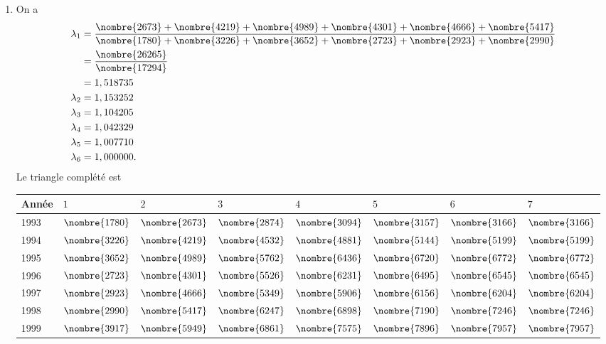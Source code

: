 \begin{exercice}
\begin{sol}
    \begin{enumerate}
    \item On a
      \begin{align*}
        \lambda_1 &= \frac{\nombre{2673} + \nombre{4219} + \nombre{4989}
                    +\nombre{4301} + \nombre{4666} + \nombre{5417}}{\nombre{1780} +
                    \nombre{3226} + \nombre{3652} + \nombre{2723} + \nombre{2923} + \nombre{2990}}\\
                  &=  \frac{\nombre{26265}}{\nombre{17294}}\\
                  &= 1,518735\\
        \lambda_2 &=  1,153252\\
        \lambda_3 &= 1,104205\\
        \lambda_4 &=  1,042329\\
        \lambda_5 &= 1,007710\\
        \lambda_6 &= 1,000000.
      \end{align*}
      Le triangle complété est
      \begin{center}
        \begin{tabular}{|l|l l l l l l l|}\hline
          Année & $1$ & $2$ & $3$ & $4$ & $5$ & $6$ & $7$\\ \hline
          1993& $\nombre{1780}$& $\nombre{2673}$& $\nombre{2874}$& $\nombre{3094}$& $\nombre{3157}$& $\nombre{3166}$& $\nombre{3166}$ \\
          1994& $\nombre{3226}$& $\nombre{4219}$& $\nombre{4532}$& $\nombre{4881}$& $\nombre{5144}$& $\nombre{5199}$& $\nombre{5199}$ \\
          1995& $\nombre{3652}$& $\nombre{4989}$& $\nombre{5762}$& $\nombre{6436}$& $\nombre{6720}$& $\nombre{6772}$& $\nombre{6772}$ \\
          1996& $\nombre{2723}$& $\nombre{4301}$& $\nombre{5526}$& $\nombre{6231}$& $\nombre{6495}$& $\nombre{6545}$& $\nombre{6545}$ \\
          1997& $\nombre{2923}$& $\nombre{4666}$& $\nombre{5349}$& $\nombre{5906}$& $\nombre{6156}$& $\nombre{6204}$& $\nombre{6204}$ \\
          1998& $\nombre{2990}$& $\nombre{5417}$& $\nombre{6247}$& $\nombre{6898}$& $\nombre{7190}$& $\nombre{7246}$& $\nombre{7246}$ \\
          1999& $\nombre{3917}$& $\nombre{5949}$& $\nombre{6861}$& $\nombre{7575}$& $\nombre{7896}$& $\nombre{7957}$& $\nombre{7957}$\\\hline
        \end{tabular}

\end{center}
\end{enumerate}
\end{sol}
\end{exercice}
